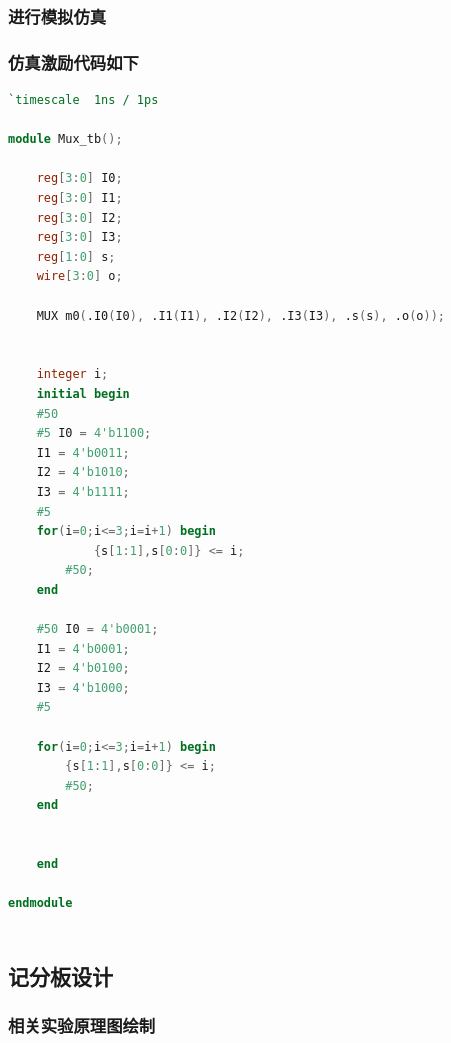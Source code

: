 \documentclass{article}
\begin{document}
\subsubsection*{进行模拟仿真}

\subsubsection*{仿真激励代码如下}
\begin{lstlisting}[language=verilog]
`timescale  1ns / 1ps

module Mux_tb();
    
    reg[3:0] I0;
    reg[3:0] I1;
    reg[3:0] I2;
    reg[3:0] I3;
    reg[1:0] s;
    wire[3:0] o;
    
    MUX m0(.I0(I0), .I1(I1), .I2(I2), .I3(I3), .s(s), .o(o));
    
    
    integer i;
    initial begin
    #50
    #5 I0 = 4'b1100;
    I1 = 4'b0011;
    I2 = 4'b1010;
    I3 = 4'b1111;
    #5
    for(i=0;i<=3;i=i+1) begin
            {s[1:1],s[0:0]} <= i;
        #50;
    end
        
    #50 I0 = 4'b0001;
    I1 = 4'b0001;
    I2 = 4'b0100;
    I3 = 4'b1000;
    #5
    
    for(i=0;i<=3;i=i+1) begin
        {s[1:1],s[0:0]} <= i;
        #50;
    end
    
        
    end
    
endmodule    
    
\end{lstlisting}







\subsection{记分板设计}

\subsubsection*{相关实验原理图绘制}
\end{document}
